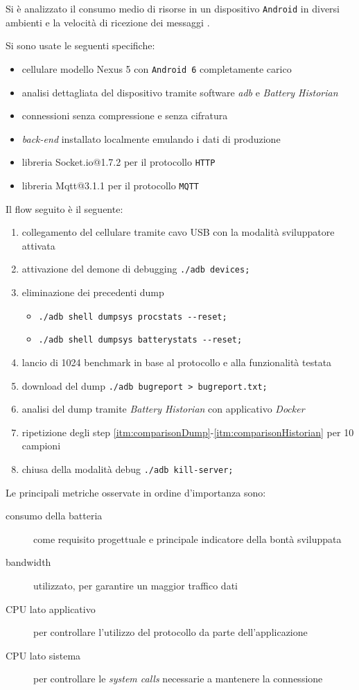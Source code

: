Si è analizzato il consumo medio di risorse in un dispositivo \verb+Android+ in diversi ambienti e la velocità di ricezione dei messaggi \cite{PowerProfiling}.

\bigskip
\noindent
Si sono usate le seguenti specifiche:
\begin{itemize}
\item cellulare modello Nexus 5 con \verb+Android 6+ completamente carico
\item analisi dettagliata del dispositivo tramite software \textit{adb} e \textit{Battery Historian} \cite{Adb, BatteryHistorian}
\item connessioni senza compressione e senza cifratura
\item \textit{back-end} installato localmente emulando i dati di produzione
\item libreria Socket.io@1.7.2 per il protocollo \verb+HTTP+
\item libreria Mqtt@3.1.1 per il protocollo \verb+MQTT+
\end{itemize}

\bigskip
\noindent
Il flow seguito è il seguente:
\begin{enumerate}
\item collegamento del cellulare tramite cavo USB con la modalità sviluppatore attivata
\item attivazione del demone di debugging \verb+./adb devices;+
\item eliminazione dei precedenti dump
  \begin{itemize}
  \item \verb+./adb shell dumpsys procstats --reset;+
  \item \verb+./adb shell dumpsys batterystats --reset;+
  \end{itemize}
\label{itm:comparisonDump}
\item lancio di 1024 benchmark in base al protocollo e alla funzionalità testata
\item download del dump \verb+./adb bugreport > bugreport.txt;+
\item analisi del dump tramite \textit{Battery Historian} con applicativo \textit{Docker}
\label{itm:comparisonHistorian}
\item ripetizione degli step \ref{itm:comparisonDump}-\ref{itm:comparisonHistorian} per 10 campioni
\item chiusa della modalità debug \verb+./adb kill-server;+
\end{enumerate}

\bigskip
\noindent
Le principali metriche osservate in ordine d'importanza sono:
\begin{description}
  \item[consumo della batteria] come requisito progettuale e principale indicatore della bontà sviluppata
  \item[bandwidth] utilizzato, per garantire un maggior traffico dati
  \item[CPU lato applicativo] per controllare l'utilizzo del protocollo da parte dell'applicazione
  \item[CPU lato sistema] per controllare le \textit{system calls} necessarie a mantenere la connessione
\end{description}

